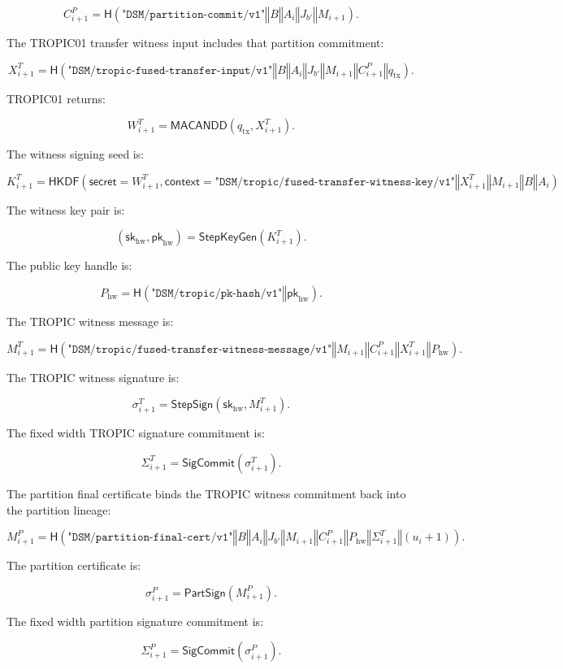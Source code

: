\documentclass[11pt]{article}
\theoremstyle{definition}
\theoremstyle{remark}
\newcommand{\concat}{\ensuremath{\mathbin{\Vert}}}
\newcommand{\Hf}{\ensuremath{\mathsf{H}}}
\newcommand{\HKDF}{\ensuremath{\mathsf{HKDF}}}
\newcommand{\MACD}{\ensuremath{\mathsf{MACANDD}}}
\newcommand{\StepKeyGen}{\ensuremath{\mathsf{StepKeyGen}}}
\newcommand{\StepSign}{\ensuremath{\mathsf{StepSign}}}
\newcommand{\PartSign}{\ensuremath{\mathsf{PartSign}}}
\newcommand{\SigCommit}{\ensuremath{\mathsf{SigCommit}}}
\newcommand{\ctx}[1]{\texttt{"#1"}}
\newcommand{\Bundle}{\ensuremath{B}}
\newcommand{\Ahead}{\ensuremath{A}}
\newcommand{\Bhead}{\ensuremath{J}}
\newcommand{\pkhw}{\ensuremath{\mathsf{pk}_{\mathrm{hw}}}}
\newcommand{\skhw}{\ensuremath{\mathsf{sk}_{\mathrm{hw}}}}
\newcommand{\pkh}{\ensuremath{P_{\mathrm{hw}}}}
\begin{document}
\[
C^P_{i+1}
=
\Hf(
  \ctx{DSM/partition-commit/v1}
  \concat \Bundle
  \concat \Ahead_i
  \concat \Bhead_{b'}
  \concat M_{i+1}
).
\]

The TROPIC01 transfer witness input includes that partition commitment:

\[
X^T_{i+1}
=
\Hf(
  \ctx{DSM/tropic-fused-transfer-input/v1}
  \concat \Bundle
  \concat \Ahead_i
  \concat \Bhead_{b'}
  \concat M_{i+1}
  \concat C^P_{i+1}
  \concat q_{\mathrm{tx}}
).
\]

TROPIC01 returns:

\[
W^T_{i+1}=\MACD(q_{\mathrm{tx}},X^T_{i+1}).
\]

The witness signing seed is:

\[
K^T_{i+1}
=
\HKDF\!\left(
  \mathsf{secret}=W^T_{i+1},
  \mathsf{context}
  =
  \ctx{DSM/tropic/fused-transfer-witness-key/v1}
  \concat X^T_{i+1}
  \concat M_{i+1}
  \concat \Bundle
  \concat \Ahead_i
\right).
\]

The witness key pair is:

\[
(\skhw,\pkhw)=\StepKeyGen(K^T_{i+1}).
\]

The public key handle is:

\[
\pkh=\Hf(\ctx{DSM/tropic/pk-hash/v1}\concat\pkhw).
\]

The TROPIC witness message is:

\[
M^T_{i+1}
=
\Hf(
  \ctx{DSM/tropic/fused-transfer-witness-message/v1}
  \concat M_{i+1}
  \concat C^P_{i+1}
  \concat X^T_{i+1}
  \concat \pkh
).
\]

The TROPIC witness signature is:

\[
\sigma^T_{i+1}=\StepSign(\skhw,M^T_{i+1}).
\]

The fixed width TROPIC signature commitment is:

\[
\Sigma^T_{i+1}=\SigCommit(\sigma^T_{i+1}).
\]

The partition final certificate binds the TROPIC witness commitment back into the partition
lineage:

\[
M^P_{i+1}
=
\Hf(
  \ctx{DSM/partition-final-cert/v1}
  \concat \Bundle
  \concat \Ahead_i
  \concat \Bhead_{b'}
  \concat M_{i+1}
  \concat C^P_{i+1}
  \concat \pkh
  \concat \Sigma^T_{i+1}
  \concat (u_i+1)
).
\]

The partition certificate is:

\[
\sigma^P_{i+1}=\PartSign(M^P_{i+1}).
\]

The fixed width partition signature commitment is:

\[
\Sigma^P_{i+1}=\SigCommit(\sigma^P_{i+1}).
\]
\end{document}
